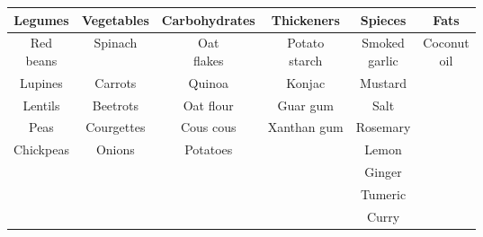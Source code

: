 \begin{tabular}{cccccc}
	\toprule
		\textbf{Legumes} & \textbf{Vegetables} & \textbf{Carbohydrates} & \textbf{Thickeners} & \textbf{Spieces} & \textbf{Fats} \\
	\midrule
		\makecell{Red\\beans}		& Spinach					& \makecell{Oat\\flakes}						& \makecell{Potato\\starch}	& \makecell{Smoked\\garlic}	& \makecell{Coconut\\oil} 	\\[0.75em]
		Lupines		& Carrots		& Quinoa					& Konjac		& Mustard						& 								\\[\spbtwrows]
		Lentils		& Beetrots		& Oat flour					& Guar gum		& Salt							& 								\\[\spbtwrows]
		Peas		& Courgettes	& Cous cous					& Xanthan gum	& Rosemary						& 								\\[\spbtwrows]
		Chickpeas	& Onions		& Potatoes					& 				& Lemon							& 								\\[\spbtwrows]
		 			& 				& 							& 				& Ginger						& 								\\[\spbtwrows]
		 			& 				& 							& 				& Tumeric						& 								\\[\spbtwrows]
		 			& 				& 							& 				& Curry							& 								\\
	\bottomrule
\end{tabular}